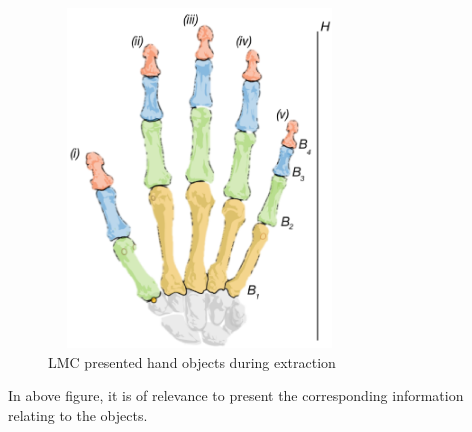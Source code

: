     
    \begin{figure}[htbp!] 
    \centering    
    \includegraphics[width=8cm,height=9cm,keepaspectratio]{Chapter3/Figs/LMC_presented_hand_objects_during_extraction.png}
    \caption[LMC presented hand objects during extraction]{LMC presented hand objects during extraction}
    \label{fig:LMC presented hand objects during extraction}
    \end{figure}

In above figure, it is of relevance to present the corresponding information relating to the objects.



